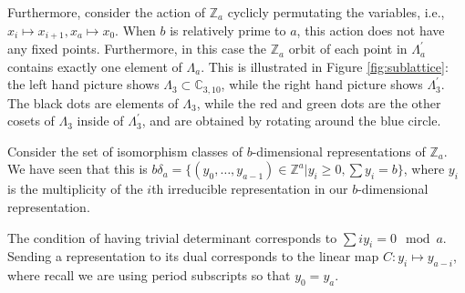 \documentclass{amsart}[12pt]
\theoremstyle{definition}
\newcommand{\Z}{\mathbb{Z}}
\newcommand{\C}{\mathbb{C}}
\begin{document}
Furthermore, consider the action of $\Z_a$ cyclicly permutating the variables, i.e., $x_i\mapsto x_{i+1}, x_{a}\mapsto x_0$.   When $b$ is relatively prime to $a$, this action does not have any fixed points.  Furthermore, in this case the $\Z_a$ orbit of each point in $\Lambda_a^\prime$ contains exactly one element of $\Lambda_a$.  This is illustrated in Figure \ref{fig:sublattice}: the left hand picture shows $\Lambda_3\subset \C_{3,10}$, while the right hand picture shows $\Lambda_3^\prime$.  The black dots are elements of $\Lambda_3$, while the red and green dots are the other cosets of $\Lambda_3$ inside of $\Lambda_3^\prime$, and are obtained by rotating around the blue circle.


Consider the set of isomorphism classes of $b$-dimensional representations of $\Z_a$.  We have seen that this is $b\delta_a=\{(y_0,\dots, y_{a-1})\in \Z^a| y_i\geq 0, \sum y_i=b\}$, where $y_i$ is the multiplicity of the $i$th irreducible representation in our $b$-dimensional representation.

The condition of having trivial determinant corresponds to $\sum iy_i=0\mod a$.  Sending a representation to its dual corresponds to the linear map $C:y_i\mapsto y_{a-i}$, where recall we are using period subscripts so that $y_0=y_a$.
\end{document}
